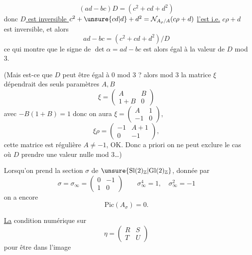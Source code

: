 
\[
(ad-bc)D=(c^2+cd+d^2) \tag{23}
\]
donc \uline{$D$ est inversible } $c^2+\unsure{cd|d}+d^2=\mathcal{N}_{A_\rho/A}(c\rho+d)$ \uline{l'est i.e.}  $c\rho+d$ est inversible, et alors
\[
ad-bc=(c^2+cd+d^2)/D
\]
ce qui montre que le signe de $\det\alpha=ad-bc$ est alors égal à la valeur de $D$ mod $3$.

(Mais est-ce que $D$ peut être égal à $0$ mod $3$ ? alors mod $3$ la matrice $\xi$  dépendrait des seuls paramètres $A,B$
\[
\xi=\begin{pmatrix}A&B\\1+B&0\end{pmatrix}
\]
avec $-B(1+B)=1$   
donc on aura $\xi=\begin{pmatrix}A&1\\-1&0\end{pmatrix}$, 
\[
\xi\rho=\begin{pmatrix}-1&A+1\\0&-1\end{pmatrix},
\]
cette matrice est régulière  $A\ne-1$, OK.\unsure{\}} Donc a priori on ne peut exclure le cas où $D$  prendre une valeur nulle mod $3$\ldots)

Lorsqu'on prend la section $\sigma$ de $\unsure{\mathrm{Sl}(2)_{\mathbb{Z}}|\mathrm{Gl}(2)_{\mathbb{Z}}}$, donnée par
\[
\sigma=\sigma_\infty=\begin{pmatrix}0&-1\\1&0\end{pmatrix}
\qquad \sigma_\infty^4=1,\quad \sigma_\infty^2=-1 \tag{24}
\]
on a encore 
\[
\mathrm{Pic}(A_\sigma)=0. \tag{25}
\]

\uline{La} condition numérique sur
\[
\eta=\begin{pmatrix}R&S\\T&U\end{pmatrix} \tag{26}
\]
pour  être  dans l'image


